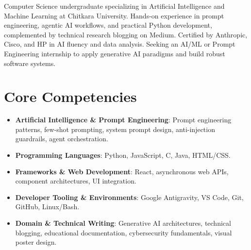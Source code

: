 \documentclass[11pt,a4paper,sans]{moderncv}
\begin{document}
\makecvtitle


\vspace{6pt}
\small{Computer Science undergraduate specializing in Artificial Intelligence and Machine Learning at Chitkara University. Hands-on experience in prompt engineering, agentic AI workflows, and practical Python development, complemented by technical research blogging on Medium. Certified by Anthropic, Cisco, and HP in AI fluency and data analysis. Seeking an AI/ML or Prompt Engineering internship to apply generative AI paradigms and build robust software systems.}


\section{Core Competencies}
\vspace{1pt}
\begin{itemize}

\item \textbf{Artificial Intelligence \& Prompt Engineering}: Prompt engineering patterns, few-shot prompting, system prompt design, anti-injection guardrails, agent orchestration.

\item \textbf{Programming Languages}: Python, JavaScript, C, Java, HTML/CSS.

\item \textbf{Frameworks \& Web Development}: React, asynchronous web APIs, component architectures, UI integration.

\item \textbf{Developer Tooling \& Environments}: Google Antigravity, VS Code, Git, GitHub, Linux/Bash.

\item \textbf{Domain \& Technical Writing}: Generative AI architectures, technical blogging, educational documentation, cybersecurity fundamentals, visual poster design.

\end{itemize}

\end{document}
